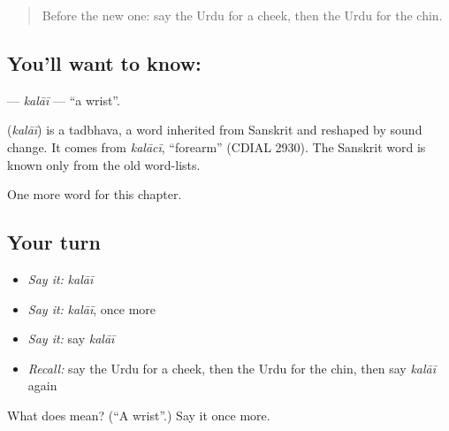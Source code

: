 \label{lesson:UR-C129-kalai}



\begin{quote}
Before the new one: say the Urdu for a cheek, then the Urdu for the chin.
\end{quote}

\subsection*{You'll want to know: }
\textbf{} — \emph{kalāī} — \textquotedblleft{}a wrist\textquotedblright{}.

\begin{cousinweb}
\textbf{} (\emph{kalāī}) is a tadbhava, a word inherited from Sanskrit and reshaped by sound change. It comes from \emph{kalācī}, \textquotedblleft{}forearm\textquotedblright{} (CDIAL 2930). The Sanskrit word is known only from the old word-lists.
\end{cousinweb}

\begin{grammarlens}[title={What you've built}]
One more word for this chapter.
\end{grammarlens}

\subsection*{Your turn}
\begin{itemize}
\raggedright
  \item \emph{Say it:} \emph{kalāī}
  \item \emph{Say it:} \emph{kalāī}, once more
  \item \emph{Say it:} say \emph{kalāī}
  \item \emph{Recall:} say the Urdu for a cheek, then the Urdu for the chin, then say \emph{kalāī} again
\end{itemize}

\begin{tcolorbox}[breakable,colback=teal!4,colframe=teal!35!black,title={Before you move on}]
What does  mean? (\textquotedblleft{}A wrist\textquotedblright{}.) Say it once more.
\end{tcolorbox}
